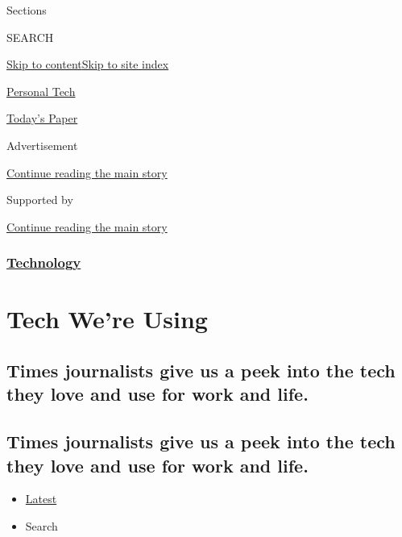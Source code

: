 Sections

SEARCH

\protect\hyperlink{site-content}{Skip to
content}\protect\hyperlink{site-index}{Skip to site index}

\href{https://www.nytimes3xbfgragh.onion/section/technology/personaltech}{Personal
Tech}

\href{https://myaccount.nytimes3xbfgragh.onion/auth/login?response_type=cookie\&client_id=vi}{}

\href{https://www.nytimes3xbfgragh.onion/section/todayspaper}{Today's
Paper}

Advertisement

\protect\hyperlink{after-top}{Continue reading the main story}

Supported by

\protect\hyperlink{after-sponsor}{Continue reading the main story}

\hypertarget{technology}{%
\subsubsection{\texorpdfstring{\href{/section/technology}{Technology}}{Technology}}\label{technology}}

\hypertarget{tech-were-using}{%
\section{Tech We're Using}\label{tech-were-using}}

\hypertarget{times-journalists-give-us-a-peek-into-the-tech-they-love-and-use-for-work-and-life}{%
\subsection{Times journalists give us a peek into the tech they love and
use for work and
life.}\label{times-journalists-give-us-a-peek-into-the-tech-they-love-and-use-for-work-and-life}}

\hypertarget{times-journalists-give-us-a-peek-into-the-tech-they-love-and-use-for-work-and-life-1}{%
\subsection{Times journalists give us a peek into the tech they love and
use for work and
life.}\label{times-journalists-give-us-a-peek-into-the-tech-they-love-and-use-for-work-and-life-1}}

\begin{itemize}
\tightlist
\item
  \protect\hyperlink{stream-panel}{Latest}
\item
  Search
\end{itemize}

